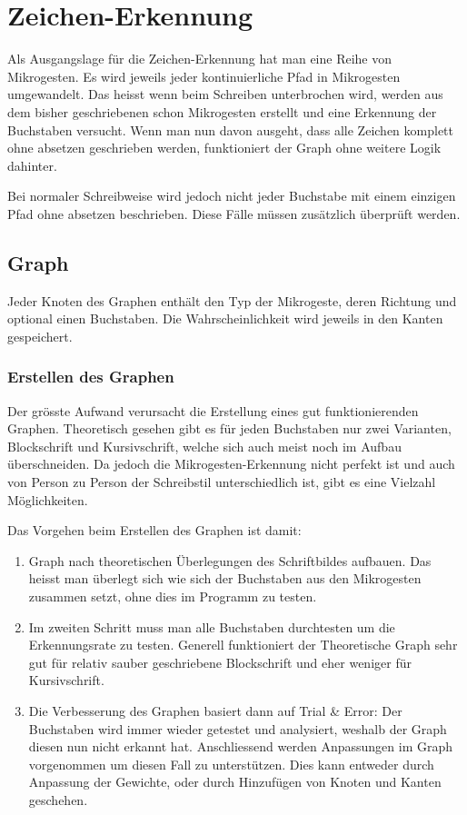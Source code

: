 \chapter{Zeichen-Erkennung}
Als Ausgangslage für die Zeichen-Erkennung hat man eine Reihe von Mikrogesten. Es wird jeweils jeder kontinuierliche Pfad in Mikrogesten umgewandelt. Das heisst wenn beim Schreiben unterbrochen wird, werden aus dem bisher geschriebenen schon Mikrogesten erstellt und eine Erkennung der Buchstaben versucht. Wenn man nun davon ausgeht, dass alle Zeichen komplett ohne absetzen geschrieben werden, funktioniert der Graph ohne weitere Logik dahinter. 

Bei normaler Schreibweise wird jedoch nicht jeder Buchstabe mit einem einzigen Pfad ohne absetzen beschrieben. Diese Fälle müssen zusätzlich überprüft werden.

\section{Graph}
Jeder Knoten des Graphen enthält den Typ der Mikrogeste, deren Richtung und optional einen Buchstaben. Die Wahrscheinlichkeit wird jeweils in den Kanten gespeichert. 

\subsection{Erstellen des Graphen}
Der grösste Aufwand verursacht die Erstellung eines gut funktionierenden Graphen. Theoretisch gesehen gibt es für jeden Buchstaben nur zwei Varianten, Blockschrift und Kursivschrift, welche sich auch meist noch im Aufbau überschneiden. Da jedoch die Mikrogesten-Erkennung nicht perfekt ist und auch von Person zu Person der Schreibstil unterschiedlich ist, gibt es eine Vielzahl Möglichkeiten. 

Das Vorgehen beim Erstellen des Graphen ist damit:
\begin{enumerate}
\item Graph nach theoretischen Überlegungen des Schriftbildes aufbauen. Das heisst man überlegt sich wie sich der Buchstaben aus den Mikrogesten zusammen setzt, ohne dies im Programm zu testen.
\item Im zweiten Schritt muss man alle Buchstaben durchtesten um die Erkennungsrate zu testen. Generell funktioniert der Theoretische Graph sehr gut für relativ sauber geschriebene Blockschrift und eher weniger für Kursivschrift.
\item Die Verbesserung des Graphen basiert dann auf Trial \& Error: Der Buchstaben wird immer wieder getestet und analysiert, weshalb der Graph diesen nun nicht erkannt hat. Anschliessend werden Anpassungen im Graph vorgenommen um diesen Fall zu unterstützen. Dies kann entweder durch Anpassung der Gewichte, oder durch Hinzufügen von Knoten und Kanten geschehen.
\end{enumerate}

